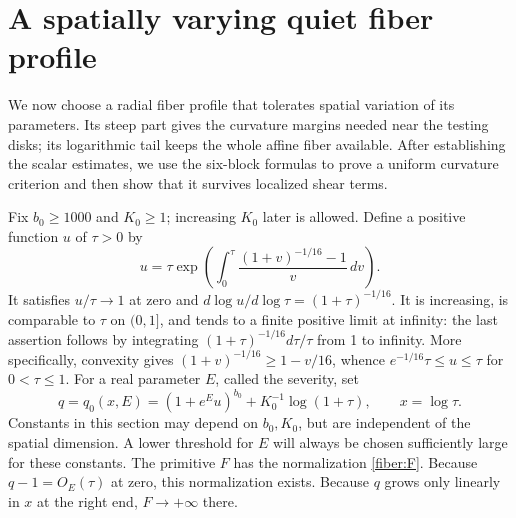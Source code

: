 \section{A spatially varying quiet fiber profile}\label{sec:quiet}

We now choose a radial fiber profile that tolerates spatial variation
of its parameters. Its steep part gives the curvature margins needed
near the testing disks; its logarithmic tail keeps the whole affine
fiber available. After establishing the scalar estimates, we use the
six-block formulas to prove a uniform curvature criterion and then
show that it survives localized shear terms.

Fix \(b_0\ge1000\) and \(K_0\ge1\); increasing \(K_0\) later is
allowed.  Define a positive function \(u\) of \(\tau>0\) by
\begin{equation}\label{quiet:u}
 u=\tau\exp\left(\int_0^\tau
       \frac{(1+v)^{-1/16}-1}{v}\,dv\right).
\end{equation}
It satisfies \(u/\tau\to1\) at zero and
\(d\log u/d\log\tau=(1+\tau)^{-1/16}\).  It is increasing, is
comparable to \(\tau\) on \((0,1]\), and tends to a finite positive
limit at infinity: the last assertion follows by integrating
\((1+\tau)^{-1/16}d\tau/\tau\) from 1 to infinity.
More specifically, convexity gives
\((1+v)^{-1/16}\ge1-v/16\), whence
\(e^{-1/16}\tau\le u\le\tau\) for \(0<\tau\le1\).
For a real parameter \(E\), called the severity, set
\begin{equation}\label{quiet:q}
 q=q_0(x,E)=(1+e^E u)^{b_0}+K_0^{-1}\log(1+\tau),
 \qquad x=\log\tau.
\end{equation}
Constants in this section may depend on \(b_0,K_0\), but are independent
of the spatial dimension.  A lower threshold for \(E\) will always be
chosen sufficiently large for these constants.  The primitive \(F\) has
the normalization \eqref{fiber:F}.  Because \(q-1=O_E(\tau)\) at zero,
this normalization exists.  Because \(q\) grows only linearly in \(x\) at
the right end, \(F\to+\infty\) there.

